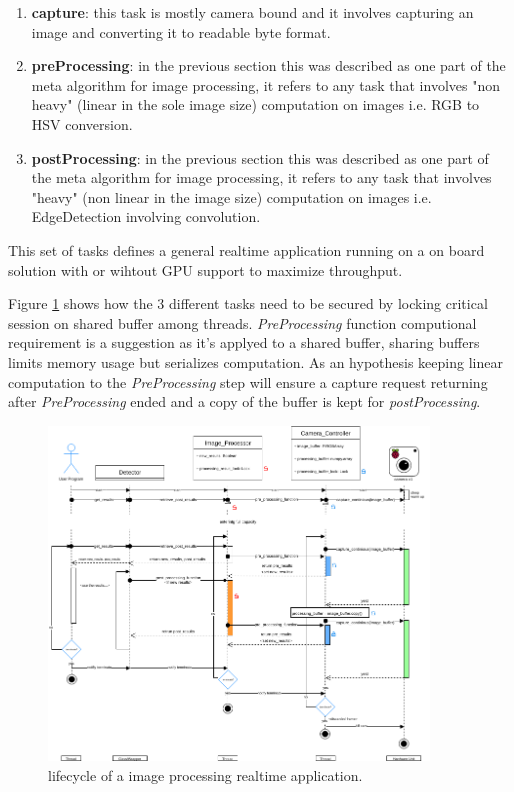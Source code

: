 \documentclass[a4paper]{report}
\begin{document}
\begin{enumerate}
    \item \textbf{capture}: this task is mostly camera bound and it involves capturing an image and converting it to readable byte format.
    \item \textbf{preProcessing}: in the previous section this was described as one part of the meta algorithm for image processing, it refers to any task that involves "non heavy" (linear in the sole image size) computation on images i.e. RGB to HSV conversion.
    \item \textbf{postProcessing}: in the previous section this was described as one part of the meta algorithm for image processing, it refers to any task that involves "heavy" (non linear in the image size) computation on images i.e. EdgeDetection involving convolution.
\end{enumerate}

This set of tasks defines a general realtime application running on a on board solution with or wihtout GPU support to maximize throughput.

Figure \ref{fig:lfcy} shows how the 3 different tasks need to be secured by locking critical session on shared buffer among threads. \textit{PreProcessing} function computional requirement is a suggestion as it's applyed to a shared buffer, sharing buffers limits memory usage but serializes computation. As an hypothesis keeping linear computation to the \textit{PreProcessing} step will ensure a capture request returning after \textit{PreProcessing} ended and a copy of the buffer is kept for \textit{postProcessing}.

\begin{figure}[H]
    \centering
    \includegraphics[width=0.9\textwidth]{Detector.png}
    \caption{lifecycle of a image processing realtime application.}
    \label{fig:lfcy}
\end{figure}
\end{document}

